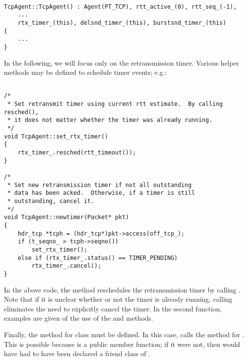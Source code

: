 \begin{small}
\begin{verbatim}

TcpAgent::TcpAgent() : Agent(PT_TCP), rtt_active_(0), rtt_seq_(-1), 
    ...
    rtx_timer_(this), delsnd_timer_(this), burstsnd_timer_(this)
{
    ...
}

\end{verbatim}
\end{small}

In the following, we will focus only on the retransmission timer.  Various
helper methods may be defined to schedule timer events; e.g.:

\begin{small}
\begin{verbatim}

/*
 * Set retransmit timer using current rtt estimate.  By calling resched(),
 * it does not matter whether the timer was already running.
 */
void TcpAgent::set_rtx_timer()
{
    rtx_timer_.resched(rtt_timeout());
}

/*
 * Set new retransmission timer if not all outstanding
 * data has been acked.  Otherwise, if a timer is still
 * outstanding, cancel it.
 */
void TcpAgent::newtimer(Packet* pkt)
{
    hdr_tcp *tcph = (hdr_tcp*)pkt->access(off_tcp_);
    if (t_seqno_ > tcph->seqno())
        set_rtx_timer();
    else if (rtx_timer_.status() == TIMER_PENDING)
        rtx_timer_.cancel();
}

\end{verbatim}
\end{small}

In the above code, the  method reschedules the 
retransmission timer by calling .  Note that if
it is unclear whether or not the timer is already running, calling
 eliminates the need to explicitly cancel the timer.  In
the second function, examples are given of the use of the 
and  methods.

Finally, the  method for class  must be 
defined.  In this case,  calls the  method
for .  This is possible because  is a 
public member function; if it were not, then  would have
had to have been declared a friend class of .

